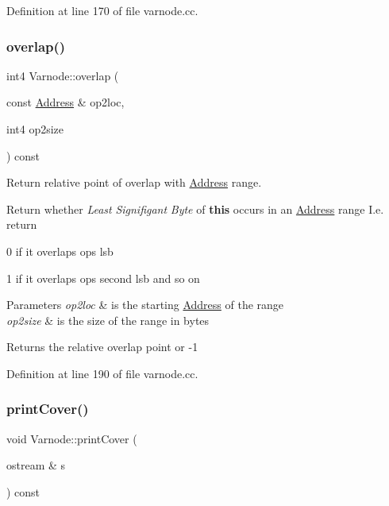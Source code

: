 Definition at line 170 of file varnode.\+cc.

\mbox{\label{class_varnode_a76b9fae2eedacde995415262b7e46189}} 
\subsubsection{\texorpdfstring{overlap()}{overlap()}\hspace{0.1cm}{\footnotesize\ttfamily [2/2]}}
{\footnotesize\ttfamily int4 Varnode\+::overlap (\begin{DoxyParamCaption}\item[{const \mbox{\hyperlink{class_address}{Address}} \&}]{op2loc,  }\item[{int4}]{op2size }\end{DoxyParamCaption}) const}



Return relative point of overlap with \mbox{\hyperlink{class_address}{Address}} range. 

Return whether {\itshape Least} {\itshape Signifigant} {\itshape Byte} of {\bfseries{this}} occurs in an \mbox{\hyperlink{class_address}{Address}} range I.\+e. return
\begin{DoxyItemize}
\item 0 if it overlaps op\textquotesingle{}s lsb
\item 1 if it overlaps op\textquotesingle{}s second lsb and so on 
\begin{DoxyParams}{Parameters}
{\em op2loc} & is the starting \mbox{\hyperlink{class_address}{Address}} of the range \\
\hline
{\em op2size} & is the size of the range in bytes \\
\hline
\end{DoxyParams}
\begin{DoxyReturn}{Returns}
the relative overlap point or -\/1 
\end{DoxyReturn}

\end{DoxyItemize}

Definition at line 190 of file varnode.\+cc.

\mbox{\label{class_varnode_a0668e171937a1db3155563d0b1fd9324}} 
\subsubsection{\texorpdfstring{printCover()}{printCover()}}
{\footnotesize\ttfamily void Varnode\+::print\+Cover (\begin{DoxyParamCaption}\item[{ostream \&}]{s }\end{DoxyParamCaption}) const}



